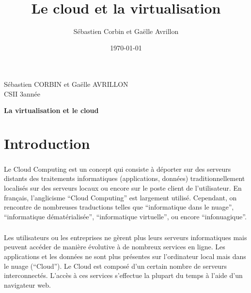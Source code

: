 \documentclass[a4paper,12pt]{report}
\title{Le cloud et la virtualisation}
\author{Sébastien Corbin et Gaëlle Avrillon}
\date{\today}
\begin{document}
\begin{onehalfspace}

		\begin{titlepage}
			\begin{center}
				Sébastien CORBIN et Gaëlle AVRILLON\\
				CSII 3\ieme année\\
			\end{center}
			\hrulefill
			\vspace{7cm}
			\begin{center} 
				\LARGE \textbf{La virtualisation et le cloud}\\
			\end{center}
		\end{titlepage}
		\newpage

		\setcounter{page}{1}
		\thispagestyle{empty}
		\newpage

	\chapter*{Introduction}
	
	\paragraph*{}
	Le Cloud Computing est un concept qui consiste à déporter sur des serveurs distants des traitements informatiques (applications, données) traditionnellement localisés sur des serveurs locaux ou encore sur le poste client de l’utilisateur. En français, l’anglicisme “Cloud Computing” est largement utilisé. Cependant, on rencontre de nombreuses traductions telles que “informatique dans le nuage”, “informatique dématérialisée”, “informatique virtuelle”, ou encore “infonuagique”.

	\paragraph*{}
	Les utilisateurs ou les entreprises ne gèrent plus leurs serveurs informatiques mais peuvent accéder de manière évolutive à de nombreux services en ligne. Les applications et les données ne sont plus présentes sur l’ordinateur local mais dans le nuage (“Cloud”). Le Cloud est composé d’un certain nombre de serveurs interconnectés. L’accès à ces services s’effectue la plupart du temps à l’aide d’un navigateur web.
	

\end{onehalfspace}
\end{document}
